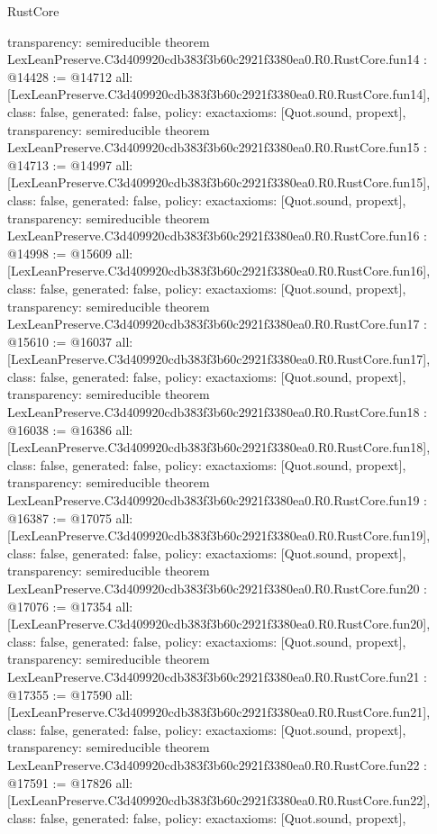 \begin{lexlean}{RustCore}
\begin{coremodule}
{  transparency: semireducible
}
theorem LexLeanPreserve.C3d409920cdb383f3b60c2921f3380ea0.R0.RustCore.fun14 : @14428 := @14712 {
  all: [LexLeanPreserve.C3d409920cdb383f3b60c2921f3380ea0.R0.RustCore.fun14],
  class: false,
  generated: false,
  policy: exact{axioms: [Quot.sound, propext]},
  transparency: semireducible
}
theorem LexLeanPreserve.C3d409920cdb383f3b60c2921f3380ea0.R0.RustCore.fun15 : @14713 := @14997 {
  all: [LexLeanPreserve.C3d409920cdb383f3b60c2921f3380ea0.R0.RustCore.fun15],
  class: false,
  generated: false,
  policy: exact{axioms: [Quot.sound, propext]},
  transparency: semireducible
}
theorem LexLeanPreserve.C3d409920cdb383f3b60c2921f3380ea0.R0.RustCore.fun16 : @14998 := @15609 {
  all: [LexLeanPreserve.C3d409920cdb383f3b60c2921f3380ea0.R0.RustCore.fun16],
  class: false,
  generated: false,
  policy: exact{axioms: [Quot.sound, propext]},
  transparency: semireducible
}
theorem LexLeanPreserve.C3d409920cdb383f3b60c2921f3380ea0.R0.RustCore.fun17 : @15610 := @16037 {
  all: [LexLeanPreserve.C3d409920cdb383f3b60c2921f3380ea0.R0.RustCore.fun17],
  class: false,
  generated: false,
  policy: exact{axioms: [Quot.sound, propext]},
  transparency: semireducible
}
theorem LexLeanPreserve.C3d409920cdb383f3b60c2921f3380ea0.R0.RustCore.fun18 : @16038 := @16386 {
  all: [LexLeanPreserve.C3d409920cdb383f3b60c2921f3380ea0.R0.RustCore.fun18],
  class: false,
  generated: false,
  policy: exact{axioms: [Quot.sound, propext]},
  transparency: semireducible
}
theorem LexLeanPreserve.C3d409920cdb383f3b60c2921f3380ea0.R0.RustCore.fun19 : @16387 := @17075 {
  all: [LexLeanPreserve.C3d409920cdb383f3b60c2921f3380ea0.R0.RustCore.fun19],
  class: false,
  generated: false,
  policy: exact{axioms: [Quot.sound, propext]},
  transparency: semireducible
}
theorem LexLeanPreserve.C3d409920cdb383f3b60c2921f3380ea0.R0.RustCore.fun20 : @17076 := @17354 {
  all: [LexLeanPreserve.C3d409920cdb383f3b60c2921f3380ea0.R0.RustCore.fun20],
  class: false,
  generated: false,
  policy: exact{axioms: [Quot.sound, propext]},
  transparency: semireducible
}
theorem LexLeanPreserve.C3d409920cdb383f3b60c2921f3380ea0.R0.RustCore.fun21 : @17355 := @17590 {
  all: [LexLeanPreserve.C3d409920cdb383f3b60c2921f3380ea0.R0.RustCore.fun21],
  class: false,
  generated: false,
  policy: exact{axioms: [Quot.sound, propext]},
  transparency: semireducible
}
theorem LexLeanPreserve.C3d409920cdb383f3b60c2921f3380ea0.R0.RustCore.fun22 : @17591 := @17826 {
  all: [LexLeanPreserve.C3d409920cdb383f3b60c2921f3380ea0.R0.RustCore.fun22],
  class: false,
  generated: false,
  policy: exact{axioms: [Quot.sound, propext]},
}
\end{coremodule}
\end{lexlean}
